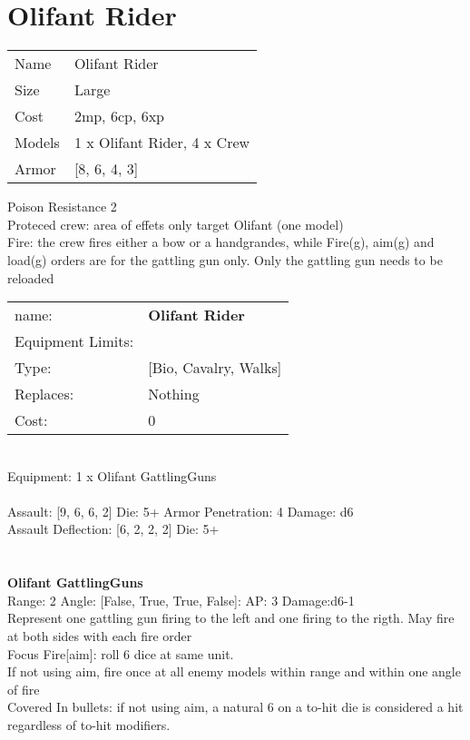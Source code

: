 \pagebreak\pagebreak

\section{ Olifant Rider }

\begin{tabular}{ll}
  Name & Olifant Rider \\
  Size & Large\\
  Cost & 2mp, 6cp, 6xp\\
  Models & 1 x Olifant Rider, 4 x Crew\\
  Armor & [8, 6, 4, 3]\\
\end{tabular}

\noindent Poison Resistance 2\\ 
Proteced crew: area of effets only target Olifant (one model)\\ 
Fire: the crew fires either a bow or a handgrandes, while Fire(g), aim(g) and load(g) orders are for the gattling gun only. Only the gattling gun needs to be reloaded\\ 


\noindent
\begin{tabular}{ll}
name: &{\bf Olifant Rider } \\
Equipment Limits: & \\
Type: &[Bio, Cavalry, Walks] \\
Replaces: &Nothing \\
Cost: & 0\\
\end{tabular}
\ \\
Equipment: 1 x Olifant GattlingGuns \\
\ \\
Assault: [9, 6, 6, 2] Die: 5+ Armor Penetration: 4 Damage: d6 \\
Assault Deflection: [6, 2, 2, 2] Die: 5+\\
\indent  
\ \\

\ \\
{\bf Olifant GattlingGuns } \\



Range: 2  Angle: [False, True, True, False]: AP: 3 Damage:d6-1 \\
Represent one gattling gun firing to the left and one firing to the rigth. May fire at both sides with each fire order\\ 
Focus Fire[aim]: roll 6 dice at same unit.\\ 
If not using aim, fire once at all enemy models within range and within one angle of fire\\ 
Covered In bullets: if not using aim, a natural 6 on a to-hit die is considered a hit regardless of to-hit modifiers.\\ 




